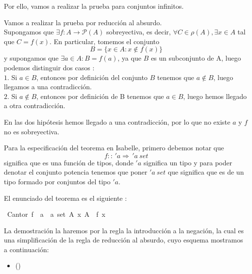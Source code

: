 \begin{isabellebody}
\begin{isamarkuptext}
Por ello,  vamos a realizar la prueba para conjuntos infinitos. 


\begin{demostracion}
 
Vamos a realizar la prueba por reducción al absurdo.\\
Supongamos que $\exists f : A \longrightarrow \mathcal{P}(A)$ sobreyectiva, es
 decir, $\forall C \in \rho(A) ,  \exists x \in A$ tal que $C = f(x)$.
En particular, tomemos el conjunto $$B = \{ x \in A : x \notin f(x) \}$$
 y  supongamos que $\exists a \in A : B = f(a)$, ya que $B$ es un
 subconjunto de A, luego podemos distinguir dos casos $:$ \\
$1.$ Si $a \in B$, entonces por definición del conjunto $B$ tenemos que
$a \notin B$, luego llegamos a una contradicción. \\
$2.$ Si $a \notin B$, entonces por definición de B tenemos que $a \in 
B$, luego hemos llegado a otra contradicción. 

En las dos hipótesis hemos llegado a una contradicción,
por lo que no existe $a$ y $f$ no es sobreyectiva.
\end{demostracion}


Para la especificación del teorema en Isabelle, primero debemos notar
 que $$f :: \, 'a \Rightarrow \,'a \: set$$
 significa que es una función 
de tipos, donde $'a$ significa un tipo y para poder denotar
el conjunto potencia tenemos que poner $'a \ set$ que significa que es
 de un tipo formado por conjuntos del tipo $'a$.




El enunciado del teorema es el siguiente :%
\end{isamarkuptext}\isamarkuptrue%
\isamarkupfalse%
\ Cantor{\isacharcolon}\ {\isachardoublequoteopen}{\isasymnexists}f\ {\isacharcolon}{\isacharcolon}\ {\isacharprime}a\ {\isasymRightarrow}\ {\isacharprime}a\ set{\isachardot}\ {\isasymforall}A{\isachardot}\ {\isasymexists}x{\isachardot}\ A\ {\isacharequal}\ f\ x{\isachardoublequoteclose}\isanewline
\isanewline
%
\isadelimproof
\isanewline
\ \ %
\endisadelimproof
%
\isatagproof
{}\isamarkupfalse%
%
\endisatagproof
{\isafoldproof}%
%
\isadelimproof
%
\endisadelimproof
%
\begin{isamarkuptext}%
La demostración la haremos por la regla la introducción a la
negación, la cual es una simplificación de la regla de 
reducción al absurdo, cuyo esquema mostramos a continuación:   
 \begin{itemize}
  \item[]  \hfill ()
  \end{itemize}



\end{isamarkuptext}
\end{isabellebody}
